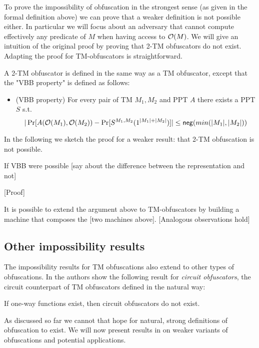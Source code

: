 To prove the impossibility of obfuscation in the strongest sense (as given in the formal definition above) we can prove that a weaker definition is not possible either. In particular we will focus about an adversary that cannot compute effectively any predicate of $M$ when having access to $\mathcal{O}(M)$.
We will give an intuition of the original proof by proving that 2-TM obfuscators do not exist. Adapting the proof for TM-obfuscators is straightforward.

\begin{mydef}
	A 2-TM obfuscator is defined in the same way as a TM obfuscator, except that the "VBB property" is defined as follows:
	\begin{itemize}
		\item (VBB property) For every pair of TM $M_1, M_2$ and PPT $A$ there exists a PPT $S$ s.t. 
		$$ |\Pr[A(\mathcal{O}(M_1), \mathcal{O}(M_2)) - \Pr[ S^{M_1,M_2}(1^{|M_1|+|M_2|})]| \leq \mathsf{neg}(min(|M_1|, |M_2|)) $$
	\end{itemize}
\end{mydef} 



In the following we sketch the proof for a weaker result: that 2-TM obfuscation is not possible.

If VBB were possible [say about the difference between the representation and not]

[Proof]

It is possible to extend the argument above to TM-obfuscators by building a machine that composes the [two machines above]. [Analogous observations hold]

\subsection{Other impossibility results}

The impossibility results for TM obfuscations also extend to other types of obfuscations.
In \cite{VBB-imp} the authors show the following result for \emph{circuit obfuscators}, the circuit counterpart of TM obfuscators defined in the natural way:

\begin{mytheorem}
	If one-way functions exist, then circuit obfuscators do not exist.
\end{mytheorem}

As discussed so far we cannot that hope for natural, strong definitions of obfuscation to exist. We will now present results in \cite{VBB-imp} on weaker variants of obfuscations and potential applications.

